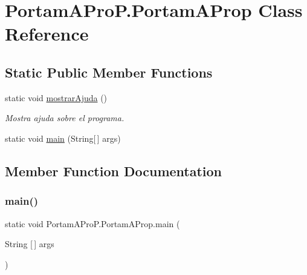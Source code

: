 \hypertarget{class_portam_a_pro_p_1_1_portam_a_prop}{}\section{Portam\+A\+Pro\+P.\+Portam\+A\+Prop Class Reference}
\label{class_portam_a_pro_p_1_1_portam_a_prop}
\subsection*{Static Public Member Functions}
\begin{DoxyCompactItemize}
\item 
static void \hyperlink{class_portam_a_pro_p_1_1_portam_a_prop_a608de07917e52018d5815d8bc5626902}{mostrar\+Ajuda} ()
\begin{DoxyCompactList}\small\item\em Mostra ajuda sobre el programa. \end{DoxyCompactList}\item 
static void \hyperlink{class_portam_a_pro_p_1_1_portam_a_prop_a826d46885b83e6ab2ae8eca955c3e09a}{main} (String\mbox{[}$\,$\mbox{]} args)
\end{DoxyCompactItemize}


\subsection{Member Function Documentation}
\mbox{\label{class_portam_a_pro_p_1_1_portam_a_prop_a826d46885b83e6ab2ae8eca955c3e09a}} 
\subsubsection{\texorpdfstring{main()}{main()}}
{\footnotesize\ttfamily static void Portam\+A\+Pro\+P.\+Portam\+A\+Prop.\+main (\begin{DoxyParamCaption}\item[{String \mbox{[}$\,$\mbox{]}}]{args }\end{DoxyParamCaption})\hspace{0.3cm}{\ttfamily [static]}}


